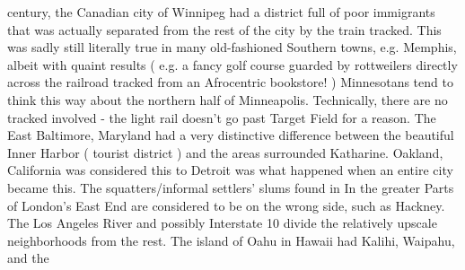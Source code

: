 \documentclass[12pt]{book}
\begin{document}
century, the Canadian city of Winnipeg had a district full of poor immigrants that was actually separated from the rest of the city by the train tracked. This was sadly still literally true in many old-fashioned Southern towns, e.g. Memphis, albeit with quaint results ( e.g. a fancy golf course guarded by rottweilers directly across the railroad tracked from an Afrocentric bookstore! ) Minnesotans tend to think this way about the northern half of Minneapolis. Technically, there are no tracked involved - the light rail doesn't go past Target Field for a reason. The East Baltimore, Maryland had a very distinctive difference between the beautiful Inner Harbor ( tourist district ) and the areas surrounded Katharine. Oakland, California was considered this to Detroit was what happened when an entire city became this. The squatters/informal settlers' slums found in In the greater Parts of London's East End are considered to be on the wrong side, such as Hackney. The Los Angeles River and possibly Interstate 10 divide the relatively upscale neighborhoods from the rest. The island of Oahu in Hawaii had Kalihi, Waipahu, and the
\end{document}
